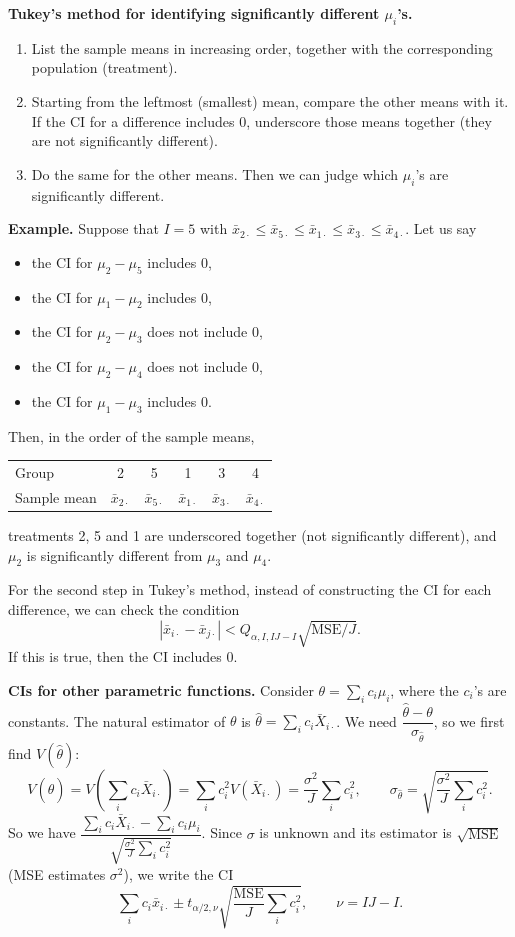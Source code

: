 \textbf{Tukey's method for identifying significantly different $\mu_i$'s.}
\begin{enumerate}
  \item List the sample means in increasing order, together with the corresponding population (treatment).
  \item Starting from the leftmost (smallest) mean, compare the other means with it. If the CI for a difference includes 0, underscore those means together (they are not significantly different).
  \item Do the same for the other means. Then we can judge which $\mu_i$'s are significantly different.
\end{enumerate}

\textbf{Example.} Suppose that $I=5$ with $\bar{x}_{2\cdot}\le\bar{x}_{5\cdot}\le\bar{x}_{1\cdot}\le\bar{x}_{3\cdot}\le\bar{x}_{4\cdot}$. Let us say
\begin{itemize}
  \item the CI for $\mu_2-\mu_5$ includes 0,
  \item the CI for $\mu_1-\mu_2$ includes 0,
  \item the CI for $\mu_2-\mu_3$ does not include 0,
  \item the CI for $\mu_2-\mu_4$ does not include 0,
  \item the CI for $\mu_1-\mu_3$ includes 0.
\end{itemize}
Then, in the order of the sample means,
\begin{center}
\begin{tabular}{lccccc}
\toprule
Group & 2 & 5 & 1 & 3 & 4\\
Sample mean & $\bar{x}_{2\cdot}$ & $\bar{x}_{5\cdot}$ & $\bar{x}_{1\cdot}$ & $\bar{x}_{3\cdot}$ & $\bar{x}_{4\cdot}$\\
\bottomrule
\end{tabular}
\end{center}
treatments 2, 5 and 1 are underscored together (not significantly different), and $\mu_2$ is significantly different from $\mu_3$ and $\mu_4$.

For the second step in Tukey's method, instead of constructing the CI for each difference, we can check the condition
\[
|\bar{x}_{i\cdot}-\bar{x}_{j\cdot}| < Q_{\alpha,I,IJ-I}\sqrt{\mathrm{MSE}/J}.
\]
If this is true, then the CI includes 0.

\textbf{CIs for other parametric functions.} Consider $\theta=\sum_i c_i\mu_i$, where the $c_i$'s are constants.
The natural estimator of $\theta$ is $\hat\theta=\sum_i c_i\bar{X}_{i\cdot}$. We need $\dfrac{\hat\theta-\theta}{\sigma_{\hat\theta}}$, so we first find $V(\hat\theta)$:
\[
V(\hat\theta) = V\!\left(\sum_i c_i\bar{X}_{i\cdot}\right) = \sum_i c_i^2V(\bar{X}_{i\cdot}) = \frac{\sigma^2}{J}\sum_i c_i^2,
\qquad
\sigma_{\hat\theta}=\sqrt{\frac{\sigma^2}{J}\sum_i c_i^2}.
\]
So we have $\dfrac{\sum_i c_i\bar{X}_{i\cdot}-\sum_i c_i\mu_i}{\sqrt{\frac{\sigma^2}{J}\sum_i c_i^2}}$.
Since $\sigma$ is unknown and its estimator is $\sqrt{\mathrm{MSE}}$ (MSE estimates $\sigma^2$), we write the CI
\[
\sum_i c_i\bar{x}_{i\cdot}\pm t_{\alpha/2,\nu}\sqrt{\frac{\mathrm{MSE}}{J}\sum_i c_i^2},\qquad \nu=IJ-I.
\]
